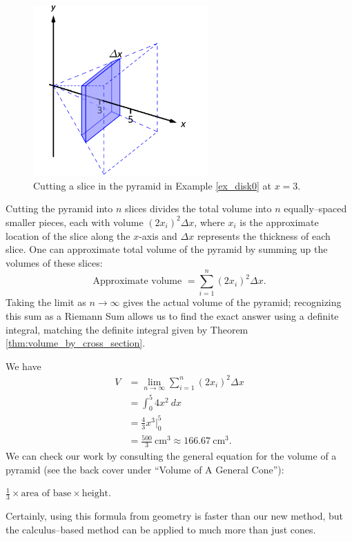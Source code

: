 \begin{solution}
{\begin{figure}
\centering
\includegraphics[width=0.6\textwidth]{figures/figcross_area1a_3D}
\caption{Cutting a slice in the pyramid in Example \ref{ex_disk0} at $x=3$.}
\label{fig:disk0a}
\end{figure}



Cutting the pyramid into $n$ slices divides the total volume into $n$ equally--spaced smaller pieces, each with volume $(2x_i)^2\Delta x$, where $x_i$ is the approximate location of the slice along the $x$-axis and $\Delta x$ represents the thickness of each slice. One can approximate total volume of the pyramid by summing up the volumes of these slices:
$$\text{Approximate volume } = \sum_{i=1}^n (2x_i)^2\Delta x.$$
Taking the limit as $n\to\infty$ gives the actual volume of the pyramid; recognizing this sum as a Riemann Sum allows us to find the exact answer using a definite integral, matching the definite integral given by Theorem \ref{thm:volume_by_cross_section}.

We have 
\begin{align*} V &= \lim_{n\to\infty} \sum_{i=1}^n (2x_i)^2\Delta x\\
							&= \int_0^5 4x^2\ dx\\
				&= \frac43x^3\Big|_0^5 \\
				&=\frac{500}{3}\ \text{cm}^3 \approx 166.67\ \text{cm}^3.
\end{align*}
We can check our work by consulting the general equation for the volume of a pyramid (see the back cover under ``Volume of A General Cone''): 

\hfill $\frac13\times \text{area of base}\times \text{height}$.\hfill \null

\noindent Certainly, using this formula from geometry is faster than our new method, but the calculus--based method can be applied to much more than just cones.
}
\end{solution}

